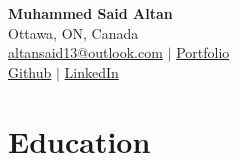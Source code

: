\documentclass[letterpaper, 10pt]{article}
\begin{document}
\begin{center}
    {\Large \textbf{Muhammed Said Altan}} \\
    Ottawa, ON, Canada \\
    \href{mailto:altansaid13@outlook.com}{altansaid13@outlook.com} $\mid$ \href{https://saidaltan.com}{Portfolio} \\
    \href{https://github.com/altansaid}{Github} $\mid$ \href{https://linkedin.com/in/saidaltan}{LinkedIn}
\end{center}

\section{Education}

\end{document}
